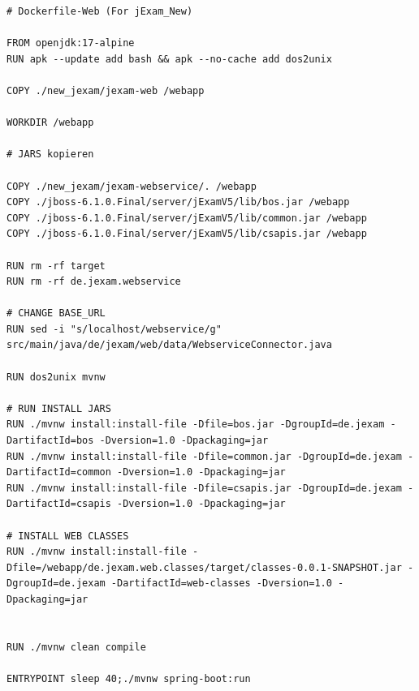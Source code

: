 \begin{lstlisting}[label={lst:docker-file-web}, caption={Dockerfile Datei des jExam New Container}]
# Dockerfile-Web (For jExam_New)

FROM openjdk:17-alpine
RUN apk --update add bash && apk --no-cache add dos2unix

COPY ./new_jexam/jexam-web /webapp

WORKDIR /webapp

# JARS kopieren

COPY ./new_jexam/jexam-webservice/. /webapp
COPY ./jboss-6.1.0.Final/server/jExamV5/lib/bos.jar /webapp
COPY ./jboss-6.1.0.Final/server/jExamV5/lib/common.jar /webapp
COPY ./jboss-6.1.0.Final/server/jExamV5/lib/csapis.jar /webapp

RUN rm -rf target
RUN rm -rf de.jexam.webservice

# CHANGE BASE_URL
RUN sed -i "s/localhost/webservice/g"  src/main/java/de/jexam/web/data/WebserviceConnector.java

RUN dos2unix mvnw

# RUN INSTALL JARS
RUN ./mvnw install:install-file -Dfile=bos.jar -DgroupId=de.jexam -DartifactId=bos -Dversion=1.0 -Dpackaging=jar
RUN ./mvnw install:install-file -Dfile=common.jar -DgroupId=de.jexam -DartifactId=common -Dversion=1.0 -Dpackaging=jar
RUN ./mvnw install:install-file -Dfile=csapis.jar -DgroupId=de.jexam -DartifactId=csapis -Dversion=1.0 -Dpackaging=jar

# INSTALL WEB CLASSES
RUN ./mvnw install:install-file -Dfile=/webapp/de.jexam.web.classes/target/classes-0.0.1-SNAPSHOT.jar -DgroupId=de.jexam -DartifactId=web-classes -Dversion=1.0 -Dpackaging=jar


RUN ./mvnw clean compile

ENTRYPOINT sleep 40;./mvnw spring-boot:run
\end{lstlisting}


